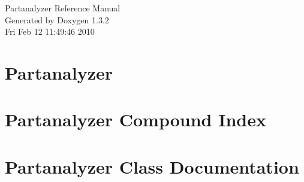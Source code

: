 \documentclass[a4paper]{book}
\begin{document}
\begin{titlepage}
\vspace*{7cm}
\begin{center}
{\Large Partanalyzer Reference Manual}\\
\vspace*{1cm}
{\large Generated by Doxygen 1.3.2}\\
\vspace*{0.5cm}
{\small Fri Feb 12 11:49:46 2010}\\
\end{center}
\end{titlepage}
\clearemptydoublepage
{}
\tableofcontents
\clearemptydoublepage
{}
\chapter{Partanalyzer }
\label{index}
\chapter{Partanalyzer Compound Index}

\chapter{Partanalyzer Class Documentation}












\printindex
\end{document}

